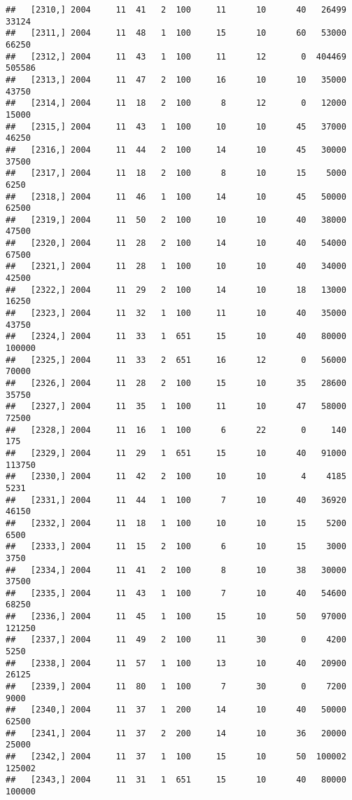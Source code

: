 \documentclass{article}\usepackage[]{graphicx}\usepackage[]{color}
\makeatletter
\newenvironment{kframe}{%
 \def\at@end@of@kframe{}%
 \ifinner\ifhmode%
  \def\at@end@of@kframe{\end{minipage}}%
  \begin{minipage}{\columnwidth}%
 \fi\fi%
 \def\FrameCommand##1{\hskip\@totalleftmargin \hskip-\fboxsep
 \colorbox{shadecolor}{##1}\hskip-\fboxsep
     \hskip-\linewidth \hskip-\@totalleftmargin \hskip\columnwidth}%
 \MakeFramed {\advance\hsize-\width
   \@totalleftmargin\z@ \linewidth\hsize
   \@setminipage}}%
 {\par\unskip\endMakeFramed%
 \at@end@of@kframe}
\newenvironment{knitrout}{}{} %
\makeatother
\begin{document}
\begin{knitrout}
\begin{kframe}
\begin{verbatim}
##   [2310,] 2004     11  41   2  100     11      10      40   26499   33124
##   [2311,] 2004     11  48   1  100     15      10      60   53000   66250
##   [2312,] 2004     11  43   1  100     11      12       0  404469  505586
##   [2313,] 2004     11  47   2  100     16      10      10   35000   43750
##   [2314,] 2004     11  18   2  100      8      12       0   12000   15000
##   [2315,] 2004     11  43   1  100     10      10      45   37000   46250
##   [2316,] 2004     11  44   2  100     14      10      45   30000   37500
##   [2317,] 2004     11  18   2  100      8      10      15    5000    6250
##   [2318,] 2004     11  46   1  100     14      10      45   50000   62500
##   [2319,] 2004     11  50   2  100     10      10      40   38000   47500
##   [2320,] 2004     11  28   2  100     14      10      40   54000   67500
##   [2321,] 2004     11  28   1  100     10      10      40   34000   42500
##   [2322,] 2004     11  29   2  100     14      10      18   13000   16250
##   [2323,] 2004     11  32   1  100     11      10      40   35000   43750
##   [2324,] 2004     11  33   1  651     15      10      40   80000  100000
##   [2325,] 2004     11  33   2  651     16      12       0   56000   70000
##   [2326,] 2004     11  28   2  100     15      10      35   28600   35750
##   [2327,] 2004     11  35   1  100     11      10      47   58000   72500
##   [2328,] 2004     11  16   1  100      6      22       0     140     175
##   [2329,] 2004     11  29   1  651     15      10      40   91000  113750
##   [2330,] 2004     11  42   2  100     10      10       4    4185    5231
##   [2331,] 2004     11  44   1  100      7      10      40   36920   46150
##   [2332,] 2004     11  18   1  100     10      10      15    5200    6500
##   [2333,] 2004     11  15   2  100      6      10      15    3000    3750
##   [2334,] 2004     11  41   2  100      8      10      38   30000   37500
##   [2335,] 2004     11  43   1  100      7      10      40   54600   68250
##   [2336,] 2004     11  45   1  100     15      10      50   97000  121250
##   [2337,] 2004     11  49   2  100     11      30       0    4200    5250
##   [2338,] 2004     11  57   1  100     13      10      40   20900   26125
##   [2339,] 2004     11  80   1  100      7      30       0    7200    9000
##   [2340,] 2004     11  37   1  200     14      10      40   50000   62500
##   [2341,] 2004     11  37   2  200     14      10      36   20000   25000
##   [2342,] 2004     11  37   1  100     15      10      50  100002  125002
##   [2343,] 2004     11  31   1  651     15      10      40   80000  100000

\end{verbatim}
\end{kframe}
\end{knitrout}
\end{document}
